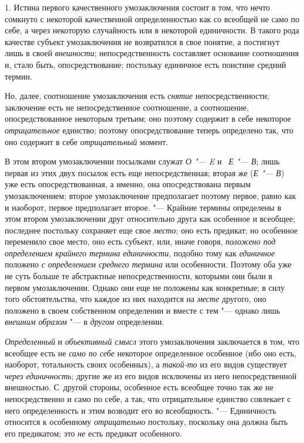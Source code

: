 {{1. Истина первого качественного умозаключения состоит в том,
что нечто сомкнуто с некоторой качественной определенностью как со всеобщей
не само по себе, а через некоторую случайность или в некоторой единичности.
В такого рода качестве субъект умозаключения не возвратился в свое понятие,
а постигнут лишь в своей {\em внешности};
непосредственность составляет основание соотношения и, стало
быть, опосредствование; постольку единичное есть поистине средний термин.

Но, далее, соотношение умозаключения есть
{\em снятие}
непосредственности; заключение есть не непосредственное
соотношение, а соотношение, опосредствованное некоторым третьим; оно
поэтому содержит в себе некоторое
{\em отрицательное}
единство; поэтому опосредствование теперь определено так, что
оно содержит в себе {\em отрицательный}
момент.

В этом втором умозаключении посылками служат
{\em О "--- E} и
~{\em Е "--- В};
лишь первая из этих двух посылок есть еще непосредственная;
вторая же ({\em Е "--- В})
уже есть опосредствованная, а именно, она опосредствована
первым умозаключением; второе умозаключение предполагает поэтому первое,
равно как и наоборот, первое предполагает второе. "--- Крайние
термины определены в этом втором умозаключении друг относительно друга как
особенное и всеобщее; последнее постольку сохраняет еще свое
{\em место}; оно есть
предикат; но особенное переменило свое место, оно есть субъект, или, иначе
говоря, {\em положено под определением
крайнего термина единичности}, подобно тому как
{\em единичное} положено
{\em с определением среднего термина}
или особенности. Поэтому оба уже не суть больше те
абстрактные непосредственности, которыми они были в первом умозаключении.
Однако они еще не положены как конкретные; в силу того обстоятельства, что
каждое из них находится на {\em месте}
другого, оно положено в своем собственном определении и
вместе с тем "--- однако лишь
{\em внешним образом} "--- в
{\em другом}
определении.

{\em Определенный} и
{\em объективный смысл}
этого умозаключения заключается в том, что всеобщее есть не
{\em само по себе}
некоторое определенное особенное (ибо оно есть, наоборот,
тотальность своих особенных), а
{\em такой-то} из его
видов существует {\em через
единичность}; другие же из его видов исключены из него
непосредственной внешностью. С~другой стороны, особенное есть всеобщее
точно так же не непосредственно и само по себе, а так, что отрицательное
единство совлекает с него определенность и этим возводит его во
всеобщность. "--- Единичность относится к особенному
{\em отрицательно}
постольку, поскольку она должна быть его предикатом; это
{\em не} есть предикат
особенного.

}}
